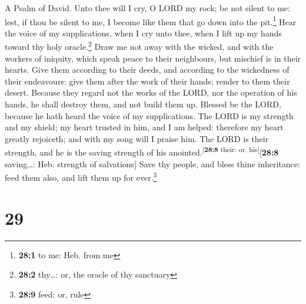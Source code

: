 A Psalm of David.  Unto thee will I cry, O LORD my rock;
be not silent to me: lest, if thou be silent to me, I become like them
that go down into the pit.\footnote{\textbf{28:1} to me: Heb. from me}
 Hear the voice of my supplications, when I cry unto thee,
when I lift up my hands toward thy holy oracle.\footnote{\textbf{28:2}
  thy\ldots: or, the oracle of thy sanctuary}  Draw me not
away with the wicked, and with the workers of iniquity, which speak
peace to their neighbours, but mischief is in their hearts.
 Give them according to their deeds, and according to the
wickedness of their endeavours: give them after the work of their hands;
render to them their desert.  Because they regard not the
works of the LORD, nor the operation of his hands, he shall destroy
them, and not build them up.  Blessed be the LORD, because
he hath heard the voice of my supplications.  The LORD is
my strength and my shield; my heart trusted in him, and I am helped:
therefore my heart greatly rejoiceth; and with my song will I praise
him.  The LORD is their strength, and he is the saving
strength of his anointed.\textsuperscript{{[}\textbf{28:8} their: or,
his{]}}{[}\textbf{28:8} saving\ldots: Heb. strength of salvations{]}
 Save thy people, and bless thine inheritance: feed them
also, and lift them up for ever.\footnote{\textbf{28:9} feed: or, rule}

\hypertarget{section-28}{%
\section{29}\label{section-28}}

